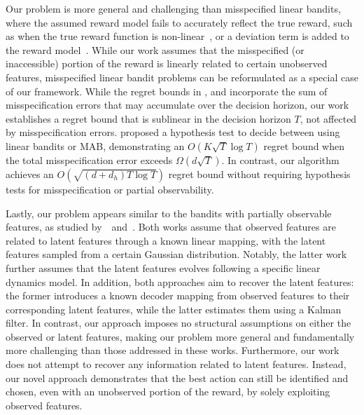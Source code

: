 Our problem is more general and challenging than misspecified linear bandits, where the assumed reward model fails to accurately reflect the true reward, such as when the true reward function is non-linear~\citep{lattimore2020bandit}, or a deviation term is added to the reward model~\citep{ghosh2017misspecified,bogunovic2021stochastic,he2022nearly}. 
While our work assumes that the misspecified (or inaccessible) portion of the reward is linearly related to certain unobserved features, misspecified linear bandit problems can be reformulated as a special case of our framework.
While the regret bounds in \citet{lattimore2020bandit}, \citet{bogunovic2021stochastic} and \citet{he2022nearly} incorporate the sum of misspecification errors that may accumulate over the decision horizon, our work establishes a regret bound that is sublinear in the decision horizon $T$, not affected by misspecification errors.
\citet{ghosh2017misspecified} proposed a hypothesis test to decide between using linear bandits or MAB, demonstrating an $O(K\sqrt{T}\log T)$ regret bound when the total misspecification error exceeds $\Omega(d\sqrt{T})$.
In contrast, our algorithm achieves an $O(\sqrt{(d+d_h)T \log T})$ regret bound without requiring hypothesis tests for misspecification or partial observability.

Lastly, our problem appears similar to the bandits with partially observable features, as studied by~\citet{park2022regret}~and~\citet{zeng2024partially}.
Both works assume that observed features are related to latent features through a known linear mapping, with the latent features sampled from a certain Gaussian distribution. 
Notably, the latter work further assumes that the latent features evolves following a specific linear dynamics model.
In addition, both approaches aim to recover the latent features: the former introduces a known decoder mapping from observed features to their corresponding latent features, while the latter estimates them using a Kalman filter.
In contrast, our approach imposes no structural assumptions on either the observed or latent features, making our problem more general and fundamentally more challenging than those addressed in these works.
Furthermore, our work does not attempt to recover any information related to latent features.
Instead, our novel approach demonstrates that the best action can still be identified and chosen, even with an unobserved portion of the reward, by solely exploiting observed features.